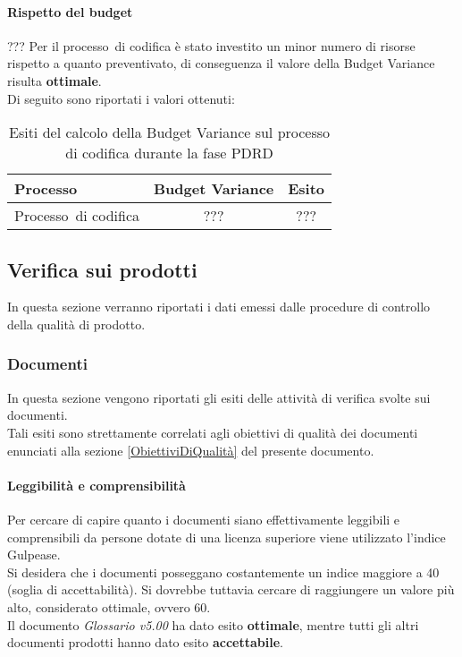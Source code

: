 \documentclass[../PianoDiQualifica.tex]{subfiles}
\begin{document}
\begin{appendices}
			\paragraph{Rispetto del budget}
			??? Per il processo\g\ di codifica è stato investito un minor numero di risorse rispetto a quanto preventivato, di conseguenza il valore della Budget Variance risulta \textbf{ottimale}.\\
			Di seguito sono riportati i valori ottenuti:
			\begin{table}[H]
				\centering
				\begin{tabular}{l * {2}{c}}
					\toprule
					\textbf{Processo} & \textbf{Budget Variance} & \textbf{Esito} \\
					\midrule
					Processo\g\ di codifica & ??? &  ??? \\
					\bottomrule
				\end{tabular}
				\caption{Esiti del calcolo della Budget Variance sul processo di codifica durante la fase PDRD}
				\label{tab:esiti_budget_variance}
			\end{table}
			
			
	\subsection{Verifica sui prodotti}
	In questa sezione verranno riportati i dati emessi dalle procedure di controllo della qualità di prodotto\g.
	
		\subsubsection{Documenti}
		In questa sezione vengono riportati gli esiti delle attività di verifica svolte sui documenti.\\
		Tali esiti sono strettamente correlati agli obiettivi di qualità dei documenti enunciati alla sezione \ref{ObiettiviDiQualità} del presente documento.
			
			\paragraph{Leggibilità e comprensibilità}
			Per cercare di capire quanto i documenti siano effettivamente leggibili e comprensibili da persone dotate di una licenza superiore viene utilizzato l'indice Gulpease\g.\\
			Si desidera che i documenti posseggano costantemente un indice maggiore a 40 (soglia di accettabilità). Si dovrebbe tuttavia cercare di raggiungere un valore più alto, considerato ottimale, ovvero 60.\\
			Il documento \textit{Glossario v5.00} ha dato esito \textbf{ottimale}, mentre tutti gli altri documenti prodotti hanno dato esito \textbf{accettabile}.
			

\end{appendices}
\end{document}
